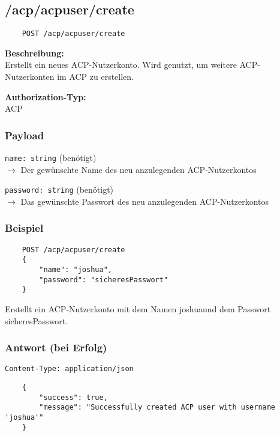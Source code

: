 \subsection{/acp/acpuser/create}

\begin{lstlisting}
    POST /acp/acpuser/create
\end{lstlisting}

\textbf{Beschreibung:} \\
Erstellt ein neues ACP-Nutzerkonto. Wird genutzt, um weitere ACP-Nutzerkonten im ACP zu erstellen.

\textbf{Authorization-Typ:} \\
ACP

\subsubsection{Payload}

\lstinline{name: string} (benötigt) \\
$\rightarrow$ Der gewünschte Name des neu anzulegenden ACP-Nutzerkontos

\lstinline{password: string} (benötigt) \\
$\rightarrow$ Das gewünschte Passwort des neu anzulegenden ACP-Nutzerkontos

\subsubsection{Beispiel}

\begin{lstlisting}
    POST /acp/acpuser/create
    {
        "name": "joshua",
        "password": "sicheresPasswort"
    }
\end{lstlisting}

Erstellt ein ACP-Nutzerkonto mit dem Namen \glqq joshua\grqq\space und dem Passwort \glqq sicheresPasswort\grqq.

\subsubsection{Antwort (bei Erfolg)}

\lstinline{Content-Type: application/json}
\begin{lstlisting}
    {
        "success": true, 
        "message": "Successfully created ACP user with username 'joshua'"
    }
\end{lstlisting}
